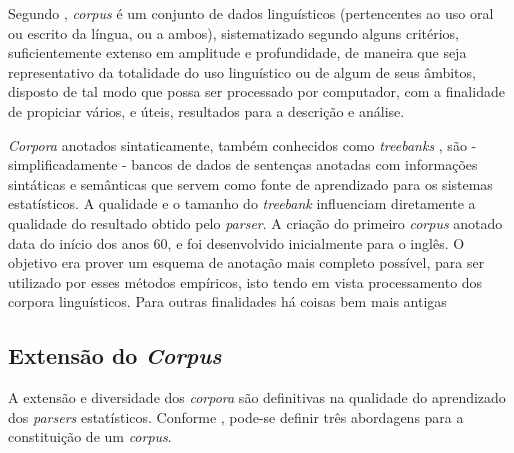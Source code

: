 Segundo \cite{sardinha04}, \emph{corpus} é um conjunto de dados linguísticos (pertencentes ao uso oral ou escrito da língua, ou a ambos), sistematizado segundo alguns critérios, suficientemente extenso em amplitude e profundidade, de maneira que seja representativo da totalidade do uso linguístico ou de algum de seus âmbitos, disposto de tal modo que possa ser processado por computador, com a finalidade de propiciar vários, e úteis, resultados para a descrição e análise.

\emph{Corpora} anotados sintaticamente, também conhecidos como \emph{treebanks} \cite{abeille03}, são - simplificadamente - bancos de dados de sentenças anotadas com informações sintáticas e semânticas que servem como fonte de aprendizado para os sistemas estatísticos. A qualidade e o tamanho do \emph{treebank} influenciam diretamente a qualidade do resultado obtido pelo \emph{parser}. A criação do primeiro \emph{corpus} anotado data do início dos anos 60, e foi desenvolvido inicialmente para o inglês. O objetivo era prover um esquema de anotação mais completo possível, para ser utilizado por esses métodos empíricos, isto tendo em vista processamento dos corpora linguísticos. Para outras finalidades há coisas bem mais antigas

\subsection{Extensão do \emph{Corpus}} %
\label{sub:extensao_do_corpus}

A extensão e diversidade dos \emph{corpora} são definitivas na qualidade do aprendizado dos \emph{parsers} estatísticos. Conforme \cite{sardinha04}, pode-se definir três abordagens para a constituição de um \emph{corpus}.

